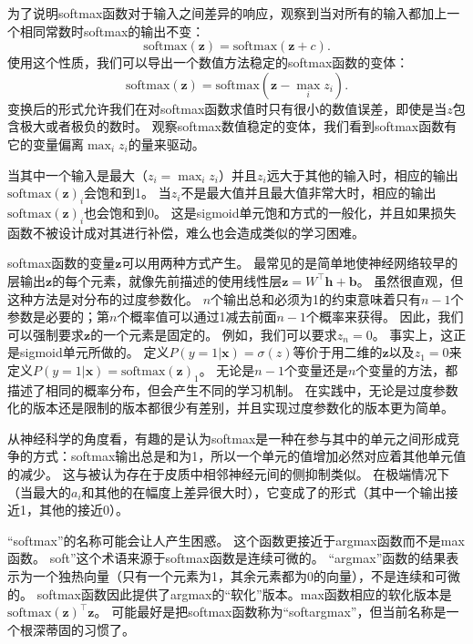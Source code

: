 
为了说明softmax函数对于输入之间差异的响应，观察到当对所有的输入都加上一个相同常数时softmax的输出不变：
\begin{equation}
\text{softmax}(\bm{z}) = \text{softmax}(\bm{z}+c).
\end{equation}
使用这个性质，我们可以导出一个数值方法稳定的softmax函数的变体：
\begin{equation}
\text{softmax}(\bm{z}) = \text{softmax}(\bm{z}- \max_i z_i).
\end{equation}
变换后的形式允许我们在对softmax函数求值时只有很小的数值误差，即使是当$z$包含极大或者极负的数时。
观察softmax数值稳定的变体，我们看到softmax函数有它的变量偏离$\max_i z_i$的量来驱动。

当其中一个输入是最大（$z_i = \max_i z_i$）并且$z_i$远大于其他的输入时，相应的输出$\text{softmax}(\bm{z})_i$会饱和到1。
当$z_i$不是最大值并且最大值非常大时，相应的输出$\text{softmax}(\bm{z})_i$也会饱和到0。
这是sigmoid单元饱和方式的一般化，并且如果损失函数不被设计成对其进行补偿，难么也会造成类似的学习困难。

softmax函数的变量$\bm{z}$可以用两种方式产生。
最常见的是简单地使神经网络较早的层输出$\bm{z}$的每个元素，就像先前描述的使用线性层$\bm{z}={W}^\top\bm{h}+\bm{b}$。
虽然很直观，但这种方法是对分布的过度参数化。
$n$个输出总和必须为1的约束意味着只有$n-1$个参数是必要的；第$n$个概率值可以通过1减去前面$n-1$个概率来获得。
因此，我们可以强制要求$\bm{z}$的一个元素是固定的。
例如，我们可以要求$z_n=0$。
事实上，这正是sigmoid单元所做的。
定义$P(y=1|\bm{x})=\sigma(z)$等价于用二维的$\bm{z}$以及$z_1=0$来定义$P(y=1|\bm{x})=\text{softmax}(\bm{z})_1$。
无论是$n-1$个变量还是$n$个变量的方法，都描述了相同的概率分布，但会产生不同的学习机制。
在实践中，无论是过度参数化的版本还是限制的版本都很少有差别，并且实现过度参数化的版本更为简单。

从神经科学的角度看，有趣的是认为softmax是一种在参与其中的单元之间形成竞争的方式：softmax输出总是和为1，所以一个单元的值增加必然对应着其他单元值的减少。
这与被认为存在于皮质中相邻神经元间的侧抑制类似。
在极端情况下（当最大的$a_i$和其他的在幅度上差异很大时），它变成了的形式（其中一个输出接近1，其他的接近0）。

``softmax''的名称可能会让人产生困惑。
这个函数更接近于argmax函数而不是max函数。
soft''这个术语来源于softmax函数是连续可微的。
``argmax''函数的结果表示为一个独热向量（只有一个元素为1，其余元素都为0的向量），不是连续和可微的。
softmax函数因此提供了argmax的``软化''版本。max函数相应的软化版本是$\text{softmax}(\bm{z})^\top \bm{z}$。
可能最好是把softmax函数称为``softargmax''，但当前名称是一个根深蒂固的习惯了。

